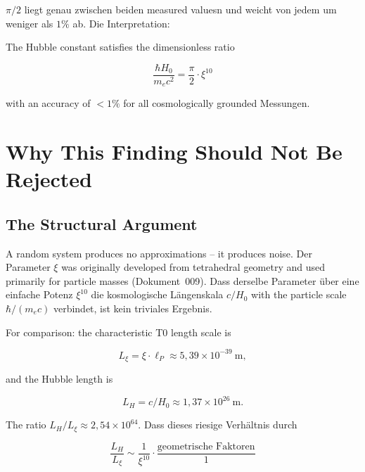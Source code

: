 $\pi/2$ liegt genau zwischen beiden measured valuesn und weicht von jedem um weniger
als $1\%$ ab. Die Interpretation:

\begin{keyresult}
    The Hubble constant satisfies the dimensionless ratio

    \begin{equation}
        \frac{\hbar H_0}{m_e c^2} = \frac{\pi}{2} \cdot \xi^{10}
        \label{eq:ratio_central}
    \end{equation}

    with an accuracy of $<1\%$ for all cosmologically grounded
    Messungen.
\end{keyresult}

\section{Why This Finding Should Not Be Rejected}
\label{sec:argument}

\subsection{The Structural Argument}

A random system produces no approximations -- it produces noise.
Der Parameter $\xi$ was originally developed from tetrahedral geometry
and used primarily for particle masses (Dokument~009). Dass derselbe
Parameter über eine einfache Potenz $\xi^{10}$ die kosmologische
Längenskala $c/H_0$ with the particle scale $\hbar/(m_e c)$ verbindet,
ist kein triviales Ergebnis.

For comparison: the characteristic T0 length scale is

\begin{equation}
    L_\xi = \xi \cdot \ell_P \approx 5{,}39 \times 10^{-39}\ \text{m},
\end{equation}

and the Hubble length is

\begin{equation}
    L_H = c / H_0 \approx 1{,}37 \times 10^{26}\ \text{m}.
\end{equation}

The ratio $L_H / L_\xi \approx 2{,}54 \times 10^{64}$. Dass dieses
riesige Verhältnis durch

\begin{equation}
    \frac{L_H}{L_\xi} \sim \frac{1}{\xi^{10}} \cdot \frac{\text{geometrische Faktoren}}{1}
\end{equation}

